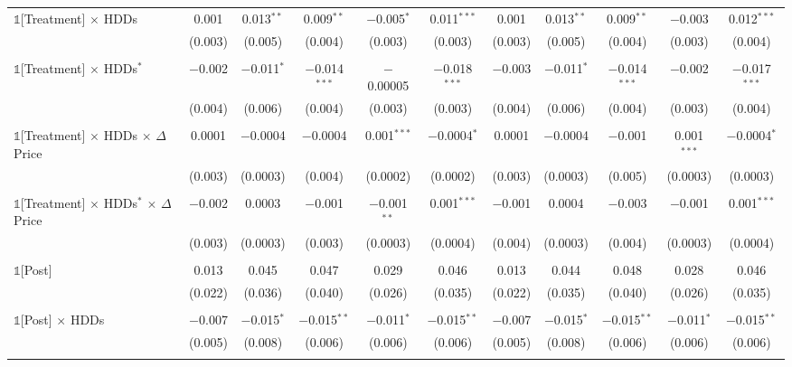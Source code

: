 \begin{table}[!htbp]
\begin{longtable}{@{\extracolsep{0pt}}lcccccccccc}
 $\mathbb{1}$[Treatment] $\times$ HDDs & 0.001 & 0.013$^{**}$ & 0.009$^{**}$ & $-$0.005$^{*}$ & 0.011$^{***}$ & 0.001 & 0.013$^{**}$ & 0.009$^{**}$ & $-$0.003 & 0.012$^{***}$ \\ 
  & (0.003) & (0.005) & (0.004) & (0.003) & (0.003) & (0.003) & (0.005) & (0.004) & (0.003) & (0.004) \\ 
  & & & & & & & & & & \\ 
 $\mathbb{1}$[Treatment] $\times$ HDDs$^{*}$ & $-$0.002 & $-$0.011$^{*}$ & $-$0.014$^{***}$ & $-$0.00005 & $-$0.018$^{***}$ & $-$0.003 & $-$0.011$^{*}$ & $-$0.014$^{***}$ & $-$0.002 & $-$0.017$^{***}$ \\ 
  & (0.004) & (0.006) & (0.004) & (0.003) & (0.003) & (0.004) & (0.006) & (0.004) & (0.003) & (0.004) \\ 
  & & & & & & & & & & \\ 
 $\mathbb{1}$[Treatment] $\times$ HDDs $\times$ $\Delta$Price & 0.0001 & $-$0.0004 & $-$0.0004 & 0.001$^{***}$ & $-$0.0004$^{*}$ & 0.0001 & $-$0.0004 & $-$0.001 & 0.001$^{***}$ & $-$0.0004$^{*}$ \\ 
  & (0.003) & (0.0003) & (0.004) & (0.0002) & (0.0002) & (0.003) & (0.0003) & (0.005) & (0.0003) & (0.0003) \\ 
  & & & & & & & & & & \\ 
 $\mathbb{1}$[Treatment] $\times$ HDDs$^{*}$ $\times$ $\Delta$Price & $-$0.002 & 0.0003 & $-$0.001 & $-$0.001$^{**}$ & 0.001$^{***}$ & $-$0.001 & 0.0004 & $-$0.003 & $-$0.001 & 0.001$^{***}$ \\ 
  & (0.003) & (0.0003) & (0.003) & (0.0003) & (0.0004) & (0.004) & (0.0003) & (0.004) & (0.0003) & (0.0004) \\ 
  & & & & & & & & & & \\ 
 $\mathbb{1}$[Post] & 0.013 & 0.045 & 0.047 & 0.029 & 0.046 & 0.013 & 0.044 & 0.048 & 0.028 & 0.046 \\ 
  & (0.022) & (0.036) & (0.040) & (0.026) & (0.035) & (0.022) & (0.035) & (0.040) & (0.026) & (0.035) \\ 
  & & & & & & & & & & \\ 
 $\mathbb{1}$[Post] $\times$ HDDs & $-$0.007 & $-$0.015$^{*}$ & $-$0.015$^{**}$ & $-$0.011$^{*}$ & $-$0.015$^{**}$ & $-$0.007 & $-$0.015$^{*}$ & $-$0.015$^{**}$ & $-$0.011$^{*}$ & $-$0.015$^{**}$ \\ 
  & (0.005) & (0.008) & (0.006) & (0.006) & (0.006) & (0.005) & (0.008) & (0.006) & (0.006) & (0.006) \\ 
  & & & & & & & & & & \\ 

\end{longtable}
\end{table}
